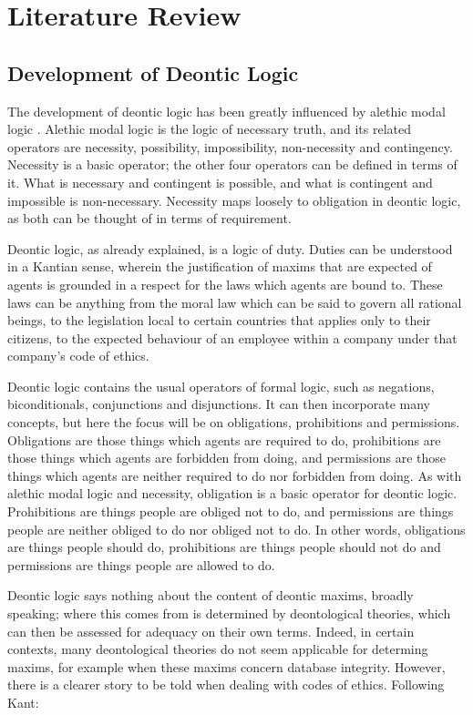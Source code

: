 \documentclass{l4proj}
\begin{document}
\chapter{Literature Review}

\section{Development of Deontic Logic}%
The development of deontic logic has been greatly influenced by alethic modal logic \cite{sep-logic-deontic}. Alethic modal logic is the logic of necessary truth, and its related operators are necessity, possibility, impossibility, non-necessity and contingency. Necessity is a basic operator; the other four operators can be defined in terms of it. What is necessary and contingent is possible, and what is contingent and impossible is non-necessary. Necessity maps loosely to obligation in deontic logic, as both can be thought of in terms of requirement. 

Deontic logic, as already explained, is a logic of duty. Duties can be understood in a Kantian sense, wherein the justification of maxims that are expected of agents is grounded in a respect for the laws which agents are bound to\cite{sep-kant-moral}. These laws can be anything from the moral law which can be said to govern all rational beings, to the legislation local to certain countries that applies only to their citizens, to the expected behaviour of an employee within a company under that company's code of ethics. 

Deontic logic contains the usual operators of formal logic, such as negations, biconditionals, conjunctions and disjunctions. It can then incorporate many concepts, but here the focus will be on obligations, prohibitions and permissions. Obligations are those things which agents are required to do, prohibitions are those things which agents are forbidden from doing, and permissions are those things which agents are neither required to do nor forbidden from doing. As with alethic modal logic and necessity, obligation is a basic operator for deontic logic. Prohibitions are things people are obliged not to do, and permissions are things people are neither obliged to do nor obliged not to do. In other words, obligations are things people should do, prohibitions are things people should not do and permissions are things people are allowed to do. 

Deontic logic says nothing about the content of deontic maxims, broadly speaking; where this comes from is determined by deontological theories, which can then be assessed for adequacy on their own terms. Indeed, in certain contexts, many deontological theories do not seem applicable for determing maxims, for example when these maxims concern database integrity. However, there is a clearer story to be told when dealing with codes of ethics. Following Kant\cite{groundwork}: 
\end{document}
